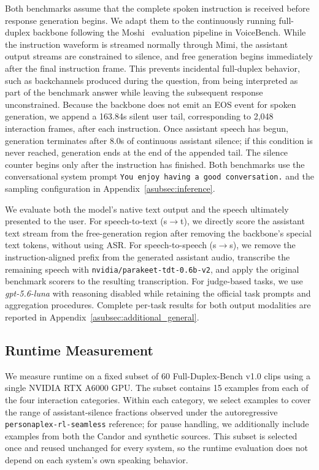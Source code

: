Both benchmarks assume that the complete spoken instruction is received before response generation begins.
We adapt them to the continuously running full-duplex backbone following the Moshi~\citep{defossez2024moshispeechtextfoundationmodel} evaluation pipeline in VoiceBench.
While the instruction waveform is streamed normally through Mimi, the assistant output streams are constrained to silence, and free generation begins immediately after the final instruction frame.
This prevents incidental full-duplex behavior, such as backchannels produced during the question, from being interpreted as part of the benchmark answer while leaving the subsequent response unconstrained.
Because the backbone does not emit an EOS event for spoken generation, we append a 163.84s silent user tail, corresponding to 2,048 interaction frames, after each instruction.
Once assistant speech has begun, generation terminates after 8.0s of continuous assistant silence; if this condition is never reached, generation ends at the end of the appended tail.
The silence counter begins only after the instruction has finished.
Both benchmarks use the conversational system prompt \texttt{You enjoy having a good conversation.} and the sampling configuration in Appendix~\ref{asubsec:inference}.

We evaluate both the model's native text output and the speech ultimately presented to the user.
For speech-to-text (s$\rightarrow$t), we directly score the assistant text stream from the free-generation region after removing the backbone's special text tokens, without using ASR.
For speech-to-speech (s$\rightarrow$s), we remove the instruction-aligned prefix from the generated assistant audio, transcribe the remaining speech with \texttt{nvidia/parakeet-tdt-0.6b-v2}, and apply the original benchmark scorers to the resulting transcription.
For judge-based tasks, we use \textit{gpt-5.6-luna} with reasoning disabled while retaining the official task prompts and aggregation procedures.
Complete per-task results for both output modalities are reported in Appendix~\ref{asubsec:additional_general}.


\subsection{Runtime Measurement}
\label{asubsec:runtime_measurement}

We measure runtime on a fixed subset of 60 Full-Duplex-Bench v1.0 clips using a single NVIDIA RTX A6000 GPU.
The subset contains 15 examples from each of the four interaction categories.
Within each category, we select examples to cover the range of assistant-silence fractions observed under the autoregressive \texttt{personaplex-rl-seamless} reference; for pause handling, we additionally include examples from both the Candor and synthetic sources.
This subset is selected once and reused unchanged for every system, so the runtime evaluation does not depend on each system's own speaking behavior.

